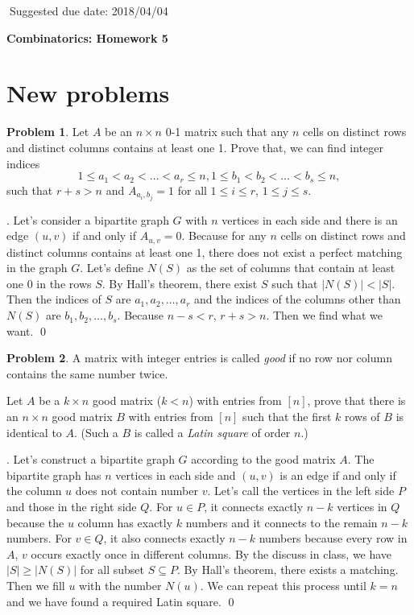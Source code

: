 \documentclass[12pt]{article}
\providecommand{\abs}[1]{\lvert#1\rvert}
\theoremstyle{definition}
\newtheorem{hw}{Problem}
\newenvironment{sol}
  {\par\vspace{3mm}\noindent{\it Solution}.}
  {\qed}
\begin{document}
$\;$\hfill Suggested due date: 2018/04/04

\bigskip

\begin{center}
{\LARGE\bf Combinatorics: Homework 5}
\end{center}

\bigskip

\section{New problems}

\begin{hw}
Let $A$ be an $n \times n$ 0-1 matrix such that any $n$ cells on
distinct rows and distinct columns contains at least one 1. Prove
that,
we can find integer indices
\[1 \leq a_1 < a_2 < \dots < a_r \leq n, 1 \leq b_1 < b_2 < \dots <
  b_s \leq n,\]
such that $r+s>n$ and $A_{a_i, b_j} = 1$ for all $1 \leq i \leq r$, $1
\leq j \leq s$.
\end{hw}

\begin{sol}
	Let's consider a bipartite graph $G$ with $n$ vertices in each side and there is an edge $(u,v)$ if and only if $A_{u,v} = 0$. Because for any $n$ cells on distinct rows and distinct columns contains at least one 1, there does not exist a perfect matching in the graph $G$. Let's define $N(S)$ as the set of columns that contain at least one $0$ in the rows $S$.	By Hall's theorem, there exist $S$ such that $\abs{N(S)} < \abs{S}$. Then the indices of $S$ are $a_1,a_2,\dots,a_r$ and the indices of the columns other than $N(S)$ are $b_1,b_2,\dots,b_s$. Because $n - s < r$, $r+s > n$. Then we find what we want.
\end{sol}

\begin{hw}
A matrix with integer entries is called {\em good} if no row nor column contains the same number
twice.

Let $A$ be a $k \times n$ good matrix ($k < n$) with entries from $[n]$, prove that there is an $n \times n$ good matrix $B$ with entries from $[n]$ such that the first $k$ rows of $B$ is identical to $A$. (Such a $B$ is called a {\em Latin square} of order $n$.)
\end{hw}

\begin{sol}
	Let's construct a bipartite graph $G$ according to the good matrix $A$. The bipartite graph has $n$ vertices in each side and $(u,v)$ is an edge if and only if the column $u$ does not contain number $v$. Let's call the vertices in the left side $P$ and those in the right side $Q$. For $u \in P$, it connects exactly $n - k$ vertices in $Q$ because the $u$ column has exactly $k$ numbers and it connects to the remain $n-k$ numbers. For $v \in Q$, it also connects exactly $n - k$ numbers because every row in $A$, $v$ occurs exactly once in different columns. By the discuss in class, we have $\abs{S} \geq \abs{N(S)}$ for all subset $S \subseteq P$. By Hall's theorem, there exists a matching. Then we fill $u$ with the number $N(u)$. We can repeat this process until $k = n$ and we have found a required Latin square.
\end{sol}
\end{document}
